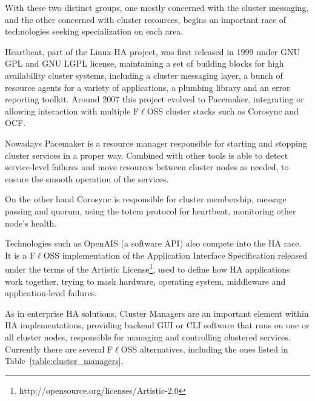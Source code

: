 \documentclass[a4paper, 12pt]{book}
\begin{document}
\noindent With these two distinct groups, one mostly concerned with the cluster messaging, and the other concerned with cluster resources, begins an important race of technologies seeking specialization on each area.\bigskip

\noindent Heartbeat, part of the Linux-HA project, was first released in 1999 under GNU GPL and GNU LGPL license, maintaining a set of building blocks for high availability cluster systems, including a cluster messaging layer, a bunch of resource agents for a variety of applications, a plumbing library and an error reporting toolkit. Around 2007 this project evolved to Pacemaker, integrating or allowing interaction with multiple F$\ell$OSS cluster stacks such as Corosync and OCF.\bigskip

\noindent Nowadays Pacemaker is a resource manager responsible for starting and stopping cluster services in a proper way. Combined with other tools is able to detect service-level failures and move resources between cluster nodes as needed, to ensure the smooth operation of the services.\bigskip

\noindent On the other hand Corosync is responsible for cluster membership, message passing and quorum, using the totem protocol 
for heartbeat, monitoring other node's health.\bigskip

\noindent Technologies such as OpenAIS (a software API) also compete into the HA race. It is a F$\ell$OSS implementation of the Application Interface Specification released under the terms of the Artistic License\footnote{ http://opensource.org/licenses/Artistic-2.0}, used to define how HA applications work together, trying to mask hardware, operating system, middleware and application-level failures.\bigskip

\noindent As in enterprise HA solutions, Cluster Managers are an important element within HA implementations, providing backend GUI or CLI software that runs on one or all cluster nodes, responsible for managing and controlling clustered services. Currently there are several F$\ell$OSS alternatives, including the ones listed in Table~\ref{table:cluster_managers}.
\end{document}
